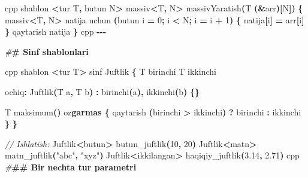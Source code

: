 \documentclass[a4paper,11pt,twoside,openright]{book}
\newenvironment{Shaded}{\begin{snugshade}}{\end{snugshade}}
\newcommand{\CharTok}[1]{\textcolor[rgb]{0.31,0.60,0.02}{#1}}
\newcommand{\CommentTok}[1]{\textcolor[rgb]{0.56,0.35,0.01}{\textit{#1}}}
\newcommand{\DecValTok}[1]{\textcolor[rgb]{0.00,0.00,0.81}{#1}}
\newcommand{\ErrorTok}[1]{\textcolor[rgb]{0.64,0.00,0.00}{\textbf{#1}}}
\newcommand{\FloatTok}[1]{\textcolor[rgb]{0.00,0.00,0.81}{#1}}
\newcommand{\NormalTok}[1]{#1}
\newcommand{\OperatorTok}[1]{\textcolor[rgb]{0.81,0.36,0.00}{\textbf{#1}}}
\newcommand{\PreprocessorTok}[1]{\textcolor[rgb]{0.56,0.35,0.01}{\textit{#1}}}
\newcommand{\StringTok}[1]{\textcolor[rgb]{0.31,0.60,0.02}{#1}}
\begin{document}
\begin{Shaded}
\begin{Highlighting}[]
\ErrorTok{\textasciigrave{}\textasciigrave{}\textasciigrave{}}\NormalTok{cpp}
\NormalTok{shablon }\OperatorTok{\textless{}}\NormalTok{tur T}\OperatorTok{,}\NormalTok{ butun N}\OperatorTok{\textgreater{}}
\NormalTok{massiv}\OperatorTok{\textless{}}\NormalTok{T}\OperatorTok{,}\NormalTok{ N}\OperatorTok{\textgreater{}}\NormalTok{ massivYaratish}\OperatorTok{(}\NormalTok{T }\OperatorTok{(\&}\NormalTok{arr}\OperatorTok{)[}\NormalTok{N}\OperatorTok{])} \OperatorTok{\{}
\NormalTok{    massiv}\OperatorTok{\textless{}}\NormalTok{T}\OperatorTok{,}\NormalTok{ N}\OperatorTok{\textgreater{}}\NormalTok{ natija}
\NormalTok{    uchun }\OperatorTok{(}\NormalTok{butun i }\OperatorTok{=} \DecValTok{0}\OperatorTok{;}\NormalTok{ i }\OperatorTok{\textless{}}\NormalTok{ N}\OperatorTok{;}\NormalTok{ i }\OperatorTok{=}\NormalTok{ i }\OperatorTok{+} \DecValTok{1}\OperatorTok{)} \OperatorTok{\{}
\NormalTok{        natija}\OperatorTok{[}\NormalTok{i}\OperatorTok{]} \OperatorTok{=}\NormalTok{ arr}\OperatorTok{[}\NormalTok{i}\OperatorTok{]}
    \OperatorTok{\}}
\NormalTok{    qaytarish natija}
\OperatorTok{\}}
\ErrorTok{\textasciigrave{}\textasciigrave{}\textasciigrave{}}\NormalTok{cpp}
\OperatorTok{{-}{-}{-}}

\PreprocessorTok{\#}\ErrorTok{\# Sinf shablonlari}

\ErrorTok{\textasciigrave{}\textasciigrave{}\textasciigrave{}}\NormalTok{cpp}
\NormalTok{shablon }\OperatorTok{\textless{}}\NormalTok{tur T}\OperatorTok{\textgreater{}}
\NormalTok{sinf Juftlik }\OperatorTok{\{}
\NormalTok{    T birinchi}
\NormalTok{    T ikkinchi}

\NormalTok{ochiq}\OperatorTok{:}
\NormalTok{    Juftlik}\OperatorTok{(}\NormalTok{T a}\OperatorTok{,}\NormalTok{ T b}\OperatorTok{)} \OperatorTok{:}\NormalTok{ birinchi}\OperatorTok{(}\NormalTok{a}\OperatorTok{),}\NormalTok{ ikkinchi}\OperatorTok{(}\NormalTok{b}\OperatorTok{)} \OperatorTok{\{\}}

\NormalTok{    T maksimum}\OperatorTok{()}\NormalTok{ o}\CharTok{\textquotesingle{}z}\ErrorTok{garmas \{}
\NormalTok{        qaytarish }\OperatorTok{(}\NormalTok{birinchi }\OperatorTok{\textgreater{}}\NormalTok{ ikkinchi}\OperatorTok{)} \OperatorTok{?}\NormalTok{ birinchi }\OperatorTok{:}\NormalTok{ ikkinchi}
    \OperatorTok{\}}
\OperatorTok{\}}

\CommentTok{// Ishlatish:}
\NormalTok{Juftlik}\OperatorTok{\textless{}}\NormalTok{butun}\OperatorTok{\textgreater{}}\NormalTok{ butun\_juftlik}\OperatorTok{(}\DecValTok{10}\OperatorTok{,} \DecValTok{20}\OperatorTok{)}
\NormalTok{Juftlik}\OperatorTok{\textless{}}\NormalTok{matn}\OperatorTok{\textgreater{}}\NormalTok{ matn\_juftlik}\OperatorTok{(}\StringTok{"abc"}\OperatorTok{,} \StringTok{"xyz"}\OperatorTok{)}
\NormalTok{Juftlik}\OperatorTok{\textless{}}\NormalTok{ikkilangan}\OperatorTok{\textgreater{}}\NormalTok{ haqiqiy\_juftlik}\OperatorTok{(}\FloatTok{3.14}\OperatorTok{,} \FloatTok{2.71}\OperatorTok{)}
\ErrorTok{\textasciigrave{}\textasciigrave{}\textasciigrave{}}\NormalTok{cpp}
\PreprocessorTok{\#}\ErrorTok{\#\# Bir nechta tur parametri}


\end{Highlighting}
\end{Shaded}
\end{document}
